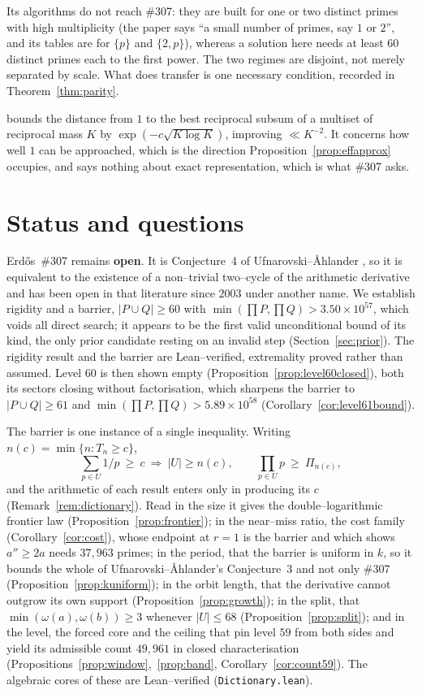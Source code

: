 \documentclass[11pt]{article}
\theoremstyle{definition}
\begin{document}
Its algorithms do not reach \#307: they are built for one or two distinct primes with high
multiplicity \textup{(}the paper says ``a small number of primes, say $1$ or $2$'', and its tables
are for $\{p\}$ and $\{2,p\}$\textup{)}, whereas a solution here needs at least $60$ distinct primes
each to the first power. The two regimes are disjoint, not merely separated by scale. What does
transfer is one necessary condition, recorded in Theorem~\ref{thm:parity}.

\cite{StretchedEG2026} bounds the distance from $1$ to the best reciprocal subsum of a multiset of
reciprocal mass $K$ by $\exp(-c\sqrt{K\log K})$, improving $\ll K^{-2}$. It concerns how well $1$
can be approached, which is the direction Proposition~\ref{prop:effapprox} occupies, and says
nothing about exact representation, which is what \#307 asks.


\section{Status and questions}\label{sec:status}

Erd\H{o}s~\#307 remains \textbf{open}. It is Conjecture~4 of Ufnarovski--\AA hlander
\cite{UfnarovskiAhlander2003}, so it is equivalent to the existence of a non--trivial two--cycle of
the arithmetic derivative and has been open in that literature since $2003$ under another name. We
establish rigidity and a barrier, $|P\cup Q|\ge60$ with $\min(\prod P,\prod Q)>3.50\times10^{57}$,
which voids all direct search; it appears to be the first valid unconditional bound of its kind,
the only prior candidate resting on an invalid step (Section~\ref{sec:prior}). The rigidity result
and the barrier are Lean--verified, extremality proved rather than assumed. Level $60$ is then shown empty
(Proposition~\ref{prop:level60closed}), both its sectors closing without factorisation, which sharpens the barrier to
$|P\cup Q|\ge61$ and $\min(\prod P,\prod Q)>5.89\times10^{58}$ (Corollary~\ref{cor:level61bound}).

The barrier is one instance of a single inequality. Writing $n(c)=\min\{n:T_n\ge c\}$,
\[ \sum_{p\in U}1/p\ \ge\ c\ \Longrightarrow\ |U|\ge n(c),\qquad \prod_{p\in U}p\ \ge\ \Pi_{n(c)}, \]
and the arithmetic of each result enters only in producing its $c$ (Remark~\ref{rem:dictionary}).
Read in the size it gives the double--logarithmic frontier law
(Proposition~\ref{prop:frontier}); in the near--miss ratio, the cost family
(Corollary~\ref{cor:cost}), whose endpoint at $r=1$ is the barrier and which shows $a''\ge2a$ needs
$37{,}963$ primes; in the period, that the barrier is uniform in $k$, so it bounds the whole of
Ufnarovski--\AA hlander's Conjecture~3 and not only \#307 (Proposition~\ref{prop:kuniform}); in the
orbit length, that the derivative cannot outgrow its own support
(Proposition~\ref{prop:growth}); in the split, that $\min(\omega(a),\omega(b))\ge3$ whenever
$|U|\le68$ (Proposition~\ref{prop:split}); and in the level, the forced core and the ceiling that
pin level $59$ from both sides and yield its admissible count $49{,}961$ in closed characterisation
(Propositions~\ref{prop:window},~\ref{prop:band}, Corollary~\ref{cor:count59}). The algebraic cores
of these are Lean--verified (\texttt{Dictionary.lean}).
\end{document}
